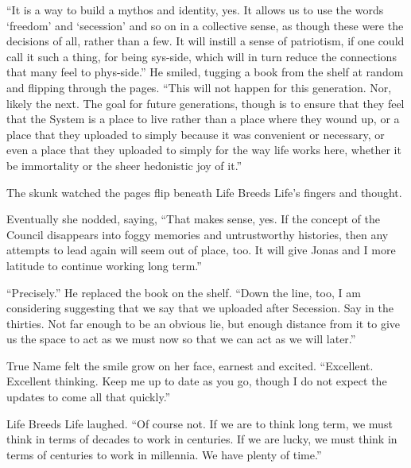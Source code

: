``It is a way to build a mythos and identity, yes. It allows us to use the words `freedom' and `secession' and so on in a collective sense, as though these were the decisions of all, rather than a few. It will instill a sense of patriotism, if one could call it such a thing, for being sys-side, which will in turn reduce the connections that many feel to phys-side.'' He smiled, tugging a book from the shelf at random and flipping through the pages. ``This will not happen for this generation. Nor, likely the next. The goal for future generations, though is to ensure that they feel that the System is a place to live rather than a place where they wound up, or a place that they uploaded to simply because it was convenient or necessary, or even a place that they uploaded to simply for the way life works here, whether it be immortality or the sheer hedonistic joy of it.''

The skunk watched the pages flip beneath Life Breeds Life's fingers and thought.

Eventually she nodded, saying, ``That makes sense, yes. If the concept of the Council disappears into foggy memories and untrustworthy histories, then any attempts to lead again will seem out of place, too. It will give Jonas and I more latitude to continue working long term.''

``Precisely.'' He replaced the book on the shelf. ``Down the line, too, I am considering suggesting that we say that we uploaded after Secession. Say in the thirties. Not far enough to be an obvious lie, but enough distance from it to give us the space to act as we must now so that we can act as we will later.''

True Name felt the smile grow on her face, earnest and excited. ``Excellent. Excellent thinking. Keep me up to date as you go, though I do not expect the updates to come all that quickly.''

Life Breeds Life laughed. ``Of course not. If we are to think long term, we must think in terms of decades to work in centuries. If we are lucky, we must think in terms of centuries to work in millennia. We have plenty of time.''
